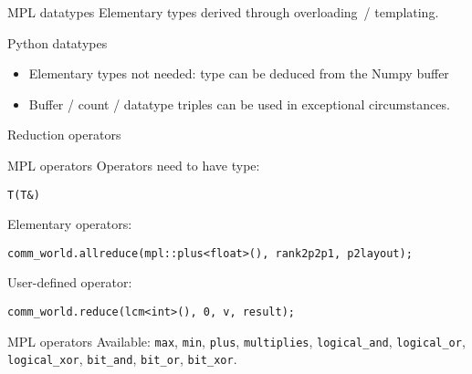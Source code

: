 \begin{mpl}
  \addtocounter{slidecount}{-1}
\begin{numberedframe}{MPL datatypes}
  Elementary types derived through overloading~/ templating.
\end{numberedframe}
\end{mpl}

\begin{python}
  \addtocounter{slidecount}{-1}
\begin{numberedframe}{Python datatypes}
  \begin{itemize}
  \item Elementary types not needed: type can be deduced from the Numpy buffer
  \item Buffer / count / datatype triples can be used
    in exceptional circumstances.
  \end{itemize}
\end{numberedframe}
\end{python}

\begin{numberedframe}{Reduction operators}
  \footnotesize
  
\end{numberedframe}

\begin{cxx}
\begin{mpl}
  \addtocounter{slidecount}{-1}

\begin{numberedframe}{MPL operators}
Operators need to have type:
\begin{lstlisting}
T(T&)
\end{lstlisting}
Elementary operators:
\begin{lstlisting}
comm_world.allreduce(mpl::plus<float>(), rank2p2p1, p2layout);
\end{lstlisting}
User-defined operator:
\begin{lstlisting}
comm_world.reduce(lcm<int>(), 0, v, result);
\end{lstlisting}
\end{numberedframe}

\begin{numberedframe}{MPL operators}
    Available: \lstinline{max}, \lstinline{min}, \lstinline{plus}, \lstinline{multiplies},
  \lstinline{logical_and}, \lstinline{logical_or}, \lstinline{logical_xor},
  \lstinline{bit_and}, \lstinline{bit_or}, \lstinline{bit_xor}.

\end{numberedframe}
\end{mpl}
\end{cxx}

